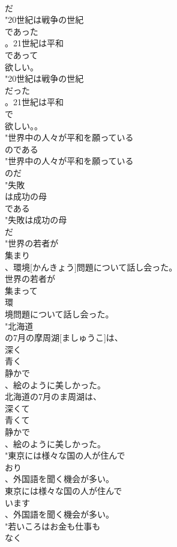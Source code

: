\documentclass[8pt]{extreport}
\begin{document}
\begin{CJK}{UTF8}{min}
\\	だ
\\	"20世紀は戦争の世紀
\\	であった
\\	。21世紀は平和
\\	であって
\\	欲しい。
\\	"20世紀は戦争の世紀
\\	だった
\\	。21世紀は平和
\\	で
\\	欲しい。。
\\	"世界中の人々が平和を願っている
\\	のである
\\	"世界中の人々が平和を願っている
\\	のだ
\\	"失敗
\\	は成功の母
\\	である
\\	"失敗は成功の母
\\	だ
\\	"世界の若者が
\\	集まり
\\	、環境[かんきょう]問題について話し会った。
\\	世界の若者が
\\	集まって
\\	環
\\	境問題について話し会った。
\\	"北海道
\\	の7月の摩周湖[ましゅうこ]は、
\\	深く
\\	青く
\\	静かで
\\	、絵のように美しかった。
\\	北海道の7月のま周湖は、
\\	深くて
\\	青くて
\\	静かで
\\	、絵のように美しかった。
\\	"東京には様々な国の人が住んで
\\	おり
\\	、外国語を聞く機会が多い。
\\	東京には様々な国の人が住んで
\\	います
\\	、外国語を聞く機会が多い。
\\	"若いころはお金も仕事も
\\	なく

\end{CJK}
\end{document}
